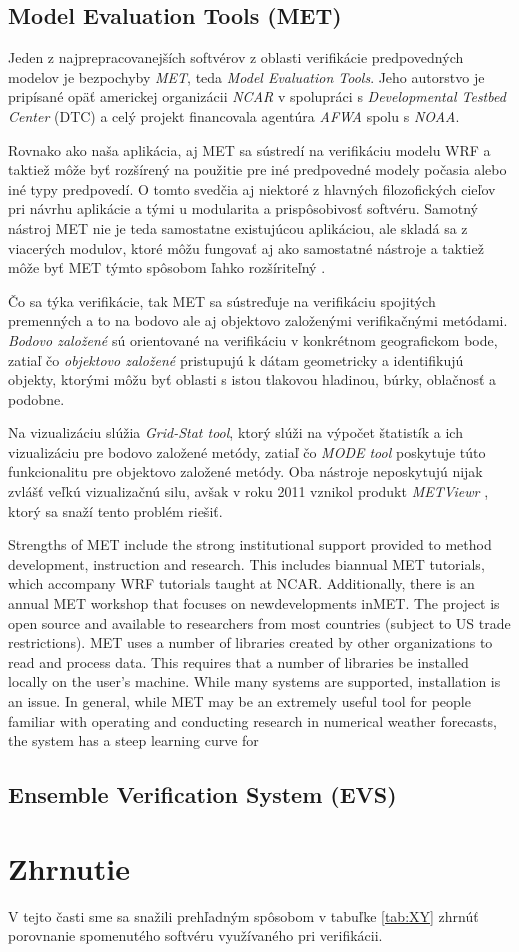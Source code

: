 \subsection[MET]{Model Evaluation Tools (MET)}
Jeden z najprepracovanejších softvérov z oblasti verifikácie predpovedných modelov je bezpochyby \textit{MET}, teda \textit{Model Evaluation Tools}. Jeho autorstvo je pripísané opäť americkej organizácii \textit{NCAR} v spolupráci s \textit{Developmental Testbed Center} (DTC) a celý projekt financovala agentúra \textit{AFWA} spolu s \textit{NOAA}.

Rovnako ako naša aplikácia, aj MET sa sústredí na verifikáciu modelu WRF a taktiež môže byť rozšírený na použitie pre iné predpovedné modely počasia alebo iné typy predpovedí. O tomto svedčia aj niektoré z hlavných filozofických cieľov pri návrhu aplikácie a tými u modularita a prispôsobivosť softvéru. Samotný nástroj MET nie je teda samostatne existujúcou aplikáciou, ale skladá sa z viacerých modulov, ktoré môžu fungovať aj ako samostatné nástroje a taktiež môže byť MET týmto spôsobom ľahko rozšíriteľný \cite{MET userguide}. 

Čo sa týka verifikácie, tak MET sa sústreďuje na verifikáciu spojitých premenných a to na bodovo ale aj objektovo založenými verifikačnými metódami. \textit{Bodovo založené} sú orientované na verifikáciu v konkrétnom geografickom bode, zatiaľ čo \textit{objektovo založené} pristupujú k dátam geometricky a identifikujú objekty, ktorými môžu byť oblasti s istou tlakovou hladinou, búrky, oblačnosť a podobne.

Na vizualizáciu slúžia \textit{Grid-Stat tool}, ktorý slúži na výpočet štatistík a ich vizualizáciu pre bodovo založené metódy, zatiaľ čo \textit{MODE tool} poskytuje túto funkcionalitu pre objektovo založené metódy. Oba nástroje neposkytujú nijak zvlášť veľkú vizualizačnú silu, avšak v roku 2011 vznikol produkt \textit{METViewr} \cite{METviewer}, ktorý sa snaží tento problém riešiť.


Strengths of MET include the strong institutional support provided to method development, instruction and research. This includes biannual MET tutorials, which accompany WRF tutorials taught at NCAR. Additionally, there is an annual MET workshop that focuses on newdevelopments inMET. The project is open source and available to researchers from most countries (subject to US trade restrictions). MET uses a number of libraries created by other organizations to read and process data. This requires that a number of libraries be installed locally on the user’s machine. While many systems are supported, installation is an issue. In general, while MET may be an extremely useful tool for people familiar with operating and conducting research in numerical weather forecasts, the system has a steep learning curve for

\subsection[EVS]{Ensemble Verification System (EVS)}


\section{Zhrnutie}
V tejto časti sme sa snažili prehľadným spôsobom v tabuľke \ref{tab:XY} zhrnúť porovnanie spomenutého softvéru využívaného pri verifikácii.
